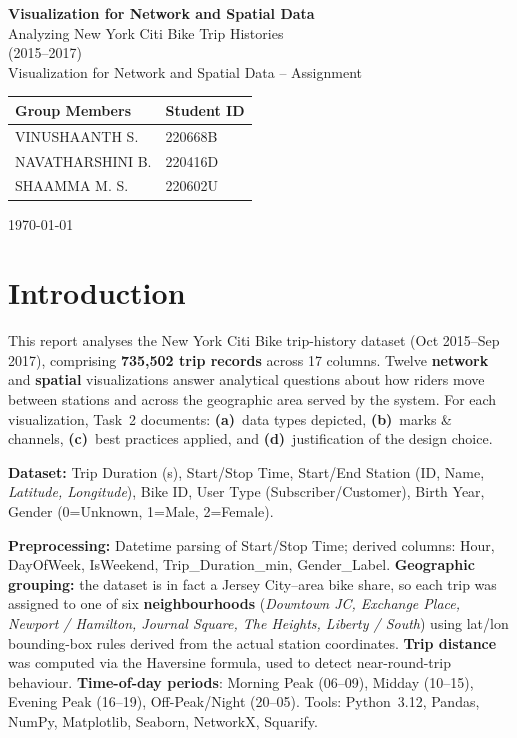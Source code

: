 \documentclass[11pt, a4paper]{article}
\begin{document}
\begin{titlepage}
\centering
\vspace*{2.5cm}
{\Huge\bfseries Visualization for Network and Spatial Data\\[0.5cm]}
{\Large Analyzing New York Citi Bike Trip Histories\\(2015--2017)\\[1.8cm]}
{\large Visualization for Network and Spatial Data -- Assignment\\[2.5cm]}

\begin{tabular}{ll}
\toprule
\textbf{Group Members} & \textbf{Student ID} \\
\midrule
VINUSHAANTH S.   & 220668B \\
NAVATHARSHINI B. & 220416D \\
SHAAMMA M. S.    & 220602U \\
\bottomrule
\end{tabular}

\vfill
{\large \today}
\end{titlepage}

\section{Introduction}
This report analyses the New York Citi Bike trip-history dataset (Oct 2015--Sep 2017), comprising \textbf{735,502 trip records} across 17 columns. Twelve \textbf{network} and \textbf{spatial} visualizations answer analytical questions about how riders move between stations and across the geographic area served by the system. For each visualization, Task~2 documents: \textbf{(a)}~data types depicted, \textbf{(b)}~marks \& channels, \textbf{(c)}~best practices applied, and \textbf{(d)}~justification of the design choice.

\textbf{Dataset:} Trip Duration (s), Start/Stop Time, Start/End Station (ID, Name, \emph{Latitude, Longitude}), Bike ID, User Type (Subscriber/Customer), Birth Year, Gender (0=Unknown, 1=Male, 2=Female).

\textbf{Preprocessing:} Datetime parsing of Start/Stop Time; derived columns: Hour, DayOfWeek, IsWeekend, Trip\_Duration\_min, Gender\_Label. \textbf{Geographic grouping:} the dataset is in fact a Jersey City--area bike share, so each trip was assigned to one of six \textbf{neighbourhoods} (\emph{Downtown JC, Exchange Place, Newport / Hamilton, Journal Square, The Heights, Liberty / South}) using lat/lon bounding-box rules derived from the actual station coordinates. \textbf{Trip distance} was computed via the Haversine formula, used to detect near-round-trip behaviour. \textbf{Time-of-day periods}: Morning Peak (06--09), Midday (10--15), Evening Peak (16--19), Off-Peak/Night (20--05). Tools: Python~3.12, Pandas, NumPy, Matplotlib, Seaborn, NetworkX, Squarify.
\end{document}
